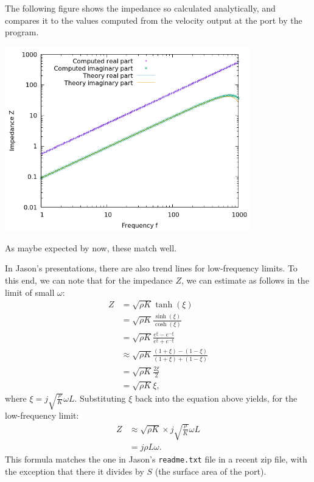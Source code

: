 \documentclass{article}
\begin{document}
The following figure shows the impedance so calculated analytically,
and compares it to the values computed from the velocity output at the
port by the program.
\begin{center}
\includegraphics[width=0.8\textwidth]{wave-guide-tet-real-material-jasons-mesh-0/impedance.png}
\end{center}
As maybe expected by now, these match well.

In Jason's presentations, there are also trend lines for low-frequency
limits. To this end, we can note that for the impedance $Z$, we can
estimate as follows in the limit of small $\omega$:
\begin{align*}
  Z
  &= 
  \sqrt{\rho K}\tanh(\xi)
  \\
  &= 
  \sqrt{\rho K}
  \frac{\sinh(\xi)}
       {\cosh(\xi)}
  \\
  &= 
  \sqrt{\rho K}
  \frac{e^\xi - e^{-\xi}}
       {e^\xi + e^{-\xi}}
  \\
  &\approx
  \sqrt{\rho K}
  \frac{(1+\xi) - (1-\xi)}
       {(1+\xi) + (1-\xi)}
  \\ 
  &=
  \sqrt{\rho K}
  \frac{2\xi}
       {2}
  \\
  &=
  \sqrt{\rho K} \xi,
\end{align*}
where $\xi=j\sqrt{\frac{\rho}{K}}\omega L$. Substituting $\xi$ back
into the equation above yields, for the low-frequency limit:
\begin{align*}
  Z
  &\approx
  \sqrt{\rho K} \times j\sqrt{\frac{\rho}{K}}\omega L
  \\
  &=
  j \rho L \omega.
\end{align*}
This formula matches the one in Jason's \texttt{readme.txt} file in a
recent zip file, with the exception that there it divides by $S$ (the
surface area of the port).
\end{document}
